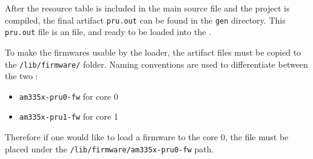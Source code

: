 After the resource table is included in the main source file and the project is compiled, the final artifact \verb|pru.out| can be found in the \verb|gen| directory. This \verb|pru.out| file is an \elf{} file, and ready to be loaded into the \pru{}.

To make the firmwares usable by the loader, the artifact files must be copied to the \verb|/lib/firmware/| folder. Naming conventions are used to differentiate between the two \pru{}:
\begin{itemize}
	\item \verb|am335x-pru0-fw| for \pru{} core 0
	\item \verb|am335x-pru1-fw| for \pru{} core 1
\end{itemize}
Therefore if one would like to load a firmware to the \pru{} core 0, the \elf{} file must be placed under the \verb|/lib/firmware/am335x-pru0-fw| path.
